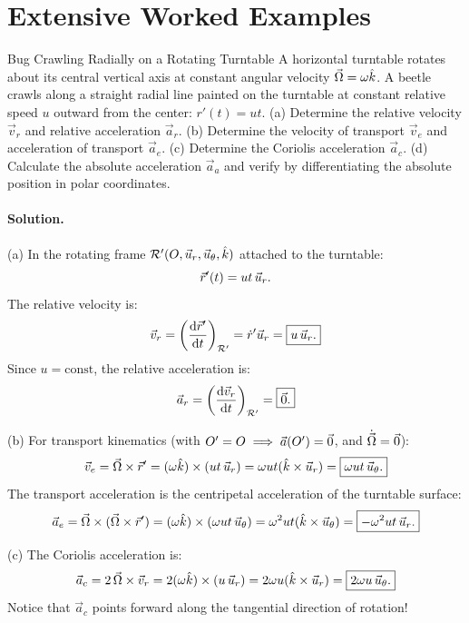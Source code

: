 \section{Extensive Worked Examples}

\begin{workedexample}{Bug Crawling Radially on a Rotating Turntable}
A horizontal turntable rotates about its central vertical axis at constant angular velocity $\vec{\Omega} = \omega\hat{k}$.
A beetle crawls along a straight radial line painted on the turntable at constant relative speed $u$ outward from the center: $r'(t) = ut$.
(a) Determine the relative velocity $\vec{v}_r$ and relative acceleration $\vec{a}_r$.
(b) Determine the velocity of transport $\vec{v}_e$ and acceleration of transport $\vec{a}_e$.
(c) Determine the Coriolis acceleration $\vec{a}_c$.
(d) Calculate the absolute acceleration $\vec{a}_a$ and verify by differentiating the absolute position in polar coordinates.

\paragraph{Solution.}

(a) In the rotating frame $\mathcal{R}'(O, \vec{u}_r, \vec{u}_\theta, \hat{k})$ attached to the turntable:
\[
\vec{r}'(t) = ut\,\vec{u}_r.
\]
The relative velocity is:
\[
\vec{v}_r = \left(\frac{\mathrm{d}\vec{r}'}{\mathrm{d} t}\right)_{\mathcal{R}'} = \dot{r}'\vec{u}_r = \boxed{u\,\vec{u}_r.}
\]
Since $u = \text{const}$, the relative acceleration is:
\[
\vec{a}_r = \left(\frac{\mathrm{d}\vec{v}_r}{\mathrm{d} t}\right)_{\mathcal{R}'} = \boxed{\vec{0}.}
\]

(b) For transport kinematics (with $O'=O \implies \vec{a}(O')=\vec{0}$, and $\dot{\vec{\Omega}}=\vec{0}$):
\[
\vec{v}_e = \vec{\Omega}\times\vec{r}' = (\omega\hat{k})\times(ut\,\vec{u}_r) = \omega ut(\hat{k}\times\vec{u}_r) = \boxed{\omega ut\,\vec{u}_\theta.}
\]
The transport acceleration is the centripetal acceleration of the turntable surface:
\[
\vec{a}_e = \vec{\Omega}\times(\vec{\Omega}\times\vec{r}') = (\omega\hat{k})\times(\omega ut\,\vec{u}_\theta) = \omega^2 ut(\hat{k}\times\vec{u}_\theta) = \boxed{-\omega^2 ut\,\vec{u}_r.}
\]

(c) The Coriolis acceleration is:
\[
\vec{a}_c = 2\,\vec{\Omega}\times\vec{v}_r = 2(\omega\hat{k})\times(u\,\vec{u}_r) = 2\omega u(\hat{k}\times\vec{u}_r) = \boxed{2\omega u\,\vec{u}_\theta.}
\]
Notice that $\vec{a}_c$ points forward along the tangential direction of rotation!


\end{workedexample}
